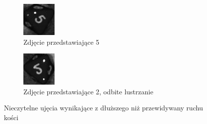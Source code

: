 \begin{figure}[h]
    \centering
    \begin{subfigure}[t]{0.45\linewidth}
        \centering
        \includegraphics[width=\linewidth]{chapters/04-czytanie/figures/5_preprocessed}
        \caption{Zdjęcie przedstawiające 5}
        \label{fig:5_confusion}
    \end{subfigure}
    \hfill
    \begin{subfigure}[t]{0.45\linewidth}
        \centering
        \includegraphics[width=\linewidth]{chapters/04-czytanie/figures/2_mirror}
        \caption{Zdjęcie przedstawiające 2, odbite lustrzanie}
        \label{fig:2_confusion}
    \end{subfigure}
    \caption{Nieczytelne ujęcia wynikające z dłuższego niż przewidywany ruchu kości}
    \label{fig:25confusion}
\end{figure}

